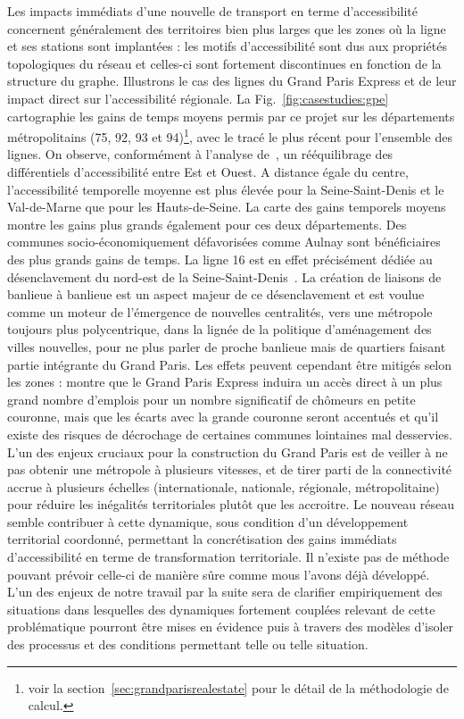 Les impacts immédiats d'une nouvelle de transport en terme d'accessibilité concernent généralement des territoires bien plus larges que les zones où la ligne et ses stations sont implantées : les motifs d'accessibilité sont dus aux propriétés topologiques du réseau et celles-ci sont fortement discontinues en fonction de la structure du graphe. Illustrons le cas des lignes du Grand Paris Express et de leur impact direct sur l'accessibilité régionale. La Fig.~\ref{fig:casestudies:gpe} cartographie les gains de temps moyens permis par ce projet sur les départements métropolitains (75, 92, 93 et 94)\footnote{voir la section~\ref{sec:grandparisrealestate} pour le détail de la méthodologie de calcul.}, avec le tracé le plus récent pour l'ensemble des lignes. On observe, conformément à l'analyse de~\cite{beaucire2013grand}, un rééquilibrage des différentiels d'accessibilité entre Est et Ouest. A distance égale du centre, l'accessibilité temporelle moyenne est plus élevée pour la Seine-Saint-Denis et le Val-de-Marne que pour les Hauts-de-Seine. La carte des gains temporels moyens montre les gains plus grands également pour ces deux départements. Des communes socio-économiquement défavorisées comme Aulnay sont bénéficiaires des plus grands gains de temps. La ligne 16 est en effet précisément dédiée au désenclavement du nord-est de la Seine-Saint-Denis~\cite{desjardins2016grand}. La création de liaisons de banlieue à banlieue est un aspect majeur de ce désenclavement et est voulue comme un moteur de l'émergence de nouvelles centralités, vers une métropole toujours plus polycentrique, dans la lignée de la politique d'aménagement des villes nouvelles, pour ne plus parler de proche banlieue mais de quartiers faisant partie intégrante du Grand Paris. Les effets peuvent cependant être mitigés selon les zones : \cite{l2013grand} montre que le Grand Paris Express induira un accès direct à un plus grand nombre d'emplois pour un nombre significatif de chômeurs en petite couronne, mais que les écarts avec la grande couronne seront accentués et qu'il existe des risques de décrochage de certaines communes lointaines mal desservies. L'un des enjeux cruciaux pour la construction du Grand Paris est de veiller à ne pas obtenir une métropole à plusieurs vitesses, et de tirer parti de la connectivité accrue à plusieurs échelles (internationale, nationale, régionale, métropolitaine) pour réduire les inégalités territoriales plutôt que les accroitre. Le nouveau réseau semble contribuer à cette dynamique, sous condition d'un développement territorial coordonné, permettant la concrétisation des gains immédiats d'accessibilité en terme de transformation territoriale. Il n'existe pas de méthode pouvant prévoir celle-ci de manière sûre comme mous l'avons déjà développé. L'un des enjeux de notre travail par la suite sera de clarifier empiriquement des situations dans lesquelles des dynamiques fortement couplées relevant de cette problématique pourront être mises en évidence puis à travers des modèles d'isoler des processus et des conditions permettant telle ou telle situation.



